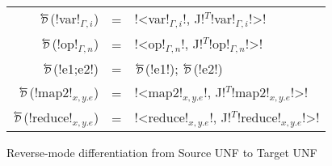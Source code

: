 \begin{figure*}[t]
    \begin{tabular}{r c l}
    $\Dsynrevsymbol$(!var!$_{\Gamma,i}$) &=& !<var!$_{\Gamma,i}$!, J!$^T$!var!$_{\Gamma,i}$!>! \\
    $\Dsynrevsymbol$(!op!$_{\Gamma,n}$) &=& !<op!$_{\Gamma,n}$!, J!$^T$!op!$_{\Gamma,n}$!>! \\ 
    $\Dsynrevsymbol$(!e1;e2!) &=& $\Dsynrevsymbol$(!e1!); $\Dsynrevsymbol$(!e2!)\\ 
    $\Dsynrevsymbol$(!map2!$_{x,y.e}$) &=& !<map2!$_{x,y.e}$!, J!$^T$!map2!$_{x,y.e}$!>! \\ 
    $\Dsynrevsymbol$(!reduce!$_{x,y.e}$) &=& !<reduce!$_{x,y.e}$!, J!$^T$!reduce!$_{x,y.e}$!>! \\  
    \end{tabular}
    \caption{Reverse-mode differentiation from Source UNF to Target UNF}
    \label{fig:diff_macro}    \end{figure*}